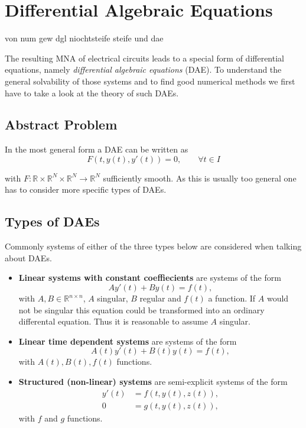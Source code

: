 \chapter{Differential Algebraic Equations}

von num gew dgl niochtsteife steife und dae

The resulting MNA of electrical circuits leads to a special form of differential equations, namely \emph{differential algebraic equations} (DAE). To understand the general solvability of those systems and to find good numerical methods we first have to take a look at the theory of such DAEs.

\section{Abstract Problem}
In the most general form a DAE can be written as
\begin{equation}
	\label{Abstract_DAE}
	F(t, y(t), y'(t)) = 0, \qquad \forall t \in I
\end{equation}

with $F:\mathbb{R} \times \mathbb{R}^N \times \mathbb{R}^N \to \mathbb{R}^N$ sufficiently smooth. As this is usually too general one has to consider more specific types of DAEs.

\section{Types of DAEs}

	Commonly systems of either of the three types below are considered when talking about DAEs.
	
	\begin{itemize}
		\item \textbf{Linear systems with constant coeffiecients} \newline
		are systems of the form 
		\begin{equation}
			\label{DAE-const-coeff}
			A y'(t) + B y(t) = f(t) ,
		\end{equation}
		with $A,B \in \mathbb{R}^{n \times n}$, $A$ singular, $B$ regular and $f(t)$ a function. If $A$ would not be singular this equation could be transformed into an ordinary differental equation. Thus it is reasonable to assume $A$ singular.
		
		\item \textbf{Linear time dependent systems}
		are systems of the form
		\begin{displaymath}
			A(t) y'(t) + B(t) y(t) = f(t) ,
		\end{displaymath}
		with $A(t),B(t),f(t)$ functions.
		
		\item  \textbf{Structured (non-linear) systems} \newline
		are semi-explicit systems of the form
		\begin{align}
			y'(t) &= f(t, y(t), z(t)) , \\
			0 &= g(t,y(t),z(t)) ,
		\end{align}
		with $f$ and $g$ functions.
	\end{itemize}
	
